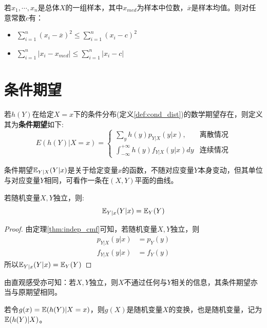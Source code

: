 \begin{proposition}
    若$x_1,\cdots ,x_n $是总体$X$的一组样本，其中$x_{med}$为样本中位数，$\overline{x}$是样本均值。则对任意常数$c$有：
    \begin{itemize}
        \item $\sum_{i=1}^n(x_i-\overline{x})^2 \le \sum_{i=1}^n(x_i-c)^2$
        \item $\sum_{i=1}^n|x_i-x_{med}| \le \sum_{i=1}^n|x_i-c|$
    \end{itemize}
\end{proposition}

\section{条件期望}

\begin{definition}
    若$h(Y)$在给定$X=x$下的条件分布(定义\ref{def:cond_dist})的数学期望存在，则定义其为\textbf{条件期望}如下:
    \[ E(h(Y)|X=x) =\begin{cases}
            \sum_y h(y) p_{Y|X}(y|x),                      & \text{离散情况} \\
            \int_{-\infty}^{+\infty} h(y) f_{Y|X}(y|x) d y & \text{连续情况}
        \end{cases}\]
\end{definition}
\begin{remark}
    条件期望$\mathbb{E}_{Y|X}(Y|x)$是关于给定变量$x$的函数，不随对应变量$Y$本身变动，但其单位与对应变量$Y$相同，可看作一条在$(X,Y)$平面的曲线。
\end{remark}

\begin{proposition}
    若随机变量$X,Y$独立，则:
    \[ \mathbb{E}_{Y|x}(Y|x)=\mathbb{E}_Y(Y) \]
\end{proposition}
\begin{proof}
    由定理\ref{thm:indep_cmf}可知，若随机变量$X,Y$独立，则
    \begin{align*}
        p_{Y|X}(y|x) & =p_Y(y) \\
        f_{Y|X}(y|x) & =f_Y(y)
    \end{align*}
    所以$\mathbb{E}_{Y|x}(Y|x)=\mathbb{E}_Y(Y)$
\end{proof}
由直观感受亦可知：若$X,Y$独立，则$X$不通过任何与$Y$相关的信息，其条件期望亦当与原期望相同。

若令$g(x)=\mathbb{E}(h(Y)|X=x)$，则$g(X)$是随机变量$X$的变换，也是随机变量，记为$\mathbb{E}(h(Y)|X)$。


